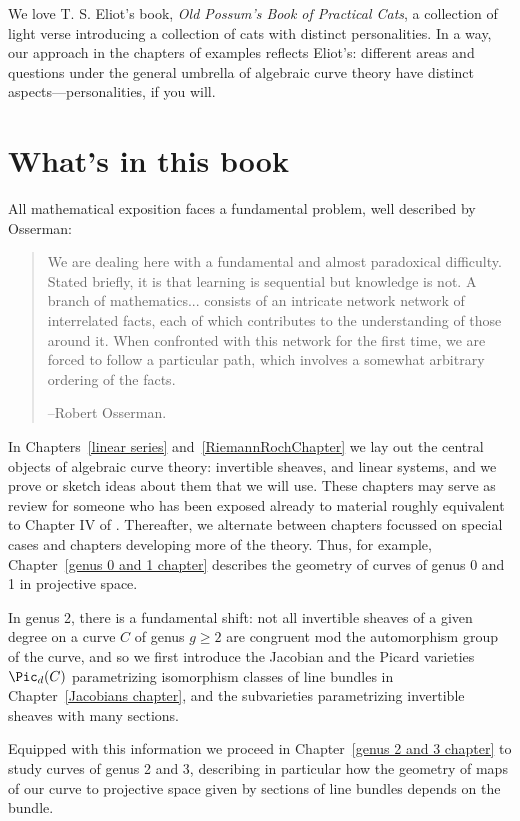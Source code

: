 We love T. S. Eliot's book, \emph{Old Possum's Book of Practical Cats}, a collection of light verse introducing a collection of cats with distinct personalities. In a way, our approach in the chapters of examples reflects Eliot's: different areas and questions under the general umbrella of algebraic curve theory have distinct aspects---personalities, if you will.


\section{What's in this book}
All mathematical exposition faces a fundamental problem, well described by Osserman:
\begin{quote}
\small\sf
We are dealing here with a fundamental and almost paradoxical difficulty. Stated briefly, it is that learning is sequential but knowledge is not. A branch of mathematics... consists of an intricate network network of interrelated facts, each of which contributes to the understanding of those around it. When confronted with this network for the first time, we are forced to follow a particular path, which involves a somewhat arbitrary ordering of the facts.

--Robert Osserman.

\end{quote}

In Chapters~\ref{linear series} and~\ref{RiemannRochChapter} we lay out the central objects of algebraic curve theory: invertible sheaves, and linear systems, and we prove or sketch ideas about them that we will use. These chapters may serve as review for someone who has been exposed already to material roughly equivalent to Chapter IV of \cite{Hartshorne1977}. Thereafter, we alternate between chapters focussed on special cases and chapters developing more of the theory. Thus, for example, Chapter~\ref{genus 0 and 1 chapter} describes the geometry of curves of genus 0 and 1 in projective space. 

In genus 2, there is a fundamental shift: not all invertible sheaves of a given degree on a curve $C$ of genus $g \geq 2$ are congruent mod the automorphism group of the curve, and so we first introduce the Jacobian and the Picard varieties $\Pic_d(C)$ parametrizing isomorphism classes of line bundles in Chapter~\ref{Jacobians chapter}, and the subvarieties parametrizing invertible sheaves with many sections.

Equipped with this information we proceed in Chapter~\ref{genus 2 and 3 chapter} to study curves of genus 2 and 3, describing in particular how the geometry of maps of our curve to projective space given by sections of line bundles depends on the bundle. 

